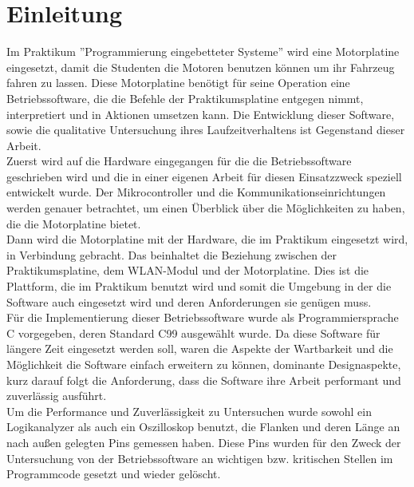 \chapter{Einleitung}

Im Praktikum ''Programmierung eingebetteter Systeme'' wird eine Motorplatine \cite{STUD_TIMO}
eingesetzt, damit die Studenten die Motoren benutzen können um ihr Fahrzeug
fahren zu lassen. Diese Motorplatine benötigt für seine Operation eine
Betriebssoftware, die die Befehle der Praktikumsplatine entgegen nimmt,
interpretiert und in Aktionen umsetzen kann. Die Entwicklung dieser Software,
sowie die qualitative Untersuchung ihres Laufzeitverhaltens ist Gegenstand
dieser Arbeit.\\
Zuerst wird auf die Hardware eingegangen für die die Betriebssoftware geschrieben wird
und die in einer eigenen Arbeit für diesen Einsatzzweck speziell entwickelt wurde.
Der Mikrocontroller und die Kommunikationseinrichtungen werden genauer betrachtet, um
einen Überblick über die Möglichkeiten zu haben, die die Motorplatine bietet.\\
Dann wird die Motorplatine mit der Hardware, die im Praktikum eingesetzt wird, in Verbindung
gebracht. Das beinhaltet die Beziehung zwischen der Praktikumsplatine, dem WLAN-Modul und der
Motorplatine. Dies ist die Plattform, die im Praktikum benutzt wird und somit die Umgebung in
der die Software auch eingesetzt wird und deren Anforderungen sie genügen muss.\\
Für die Implementierung dieser Betriebssoftware wurde als Programmiersprache
C \cite{C_PROG} vorgegeben, deren Standard C99 ausgewählt wurde. Da diese
Software für längere Zeit eingesetzt werden soll, waren die Aspekte der
Wartbarkeit und die Möglichkeit die Software einfach erweitern zu können,
dominante Designaspekte, kurz darauf folgt die Anforderung, dass die Software
ihre Arbeit performant und zuverlässig ausführt.\\
Um die Performance und Zuverlässigkeit zu Untersuchen wurde sowohl ein
Logikanalyzer als auch ein Oszilloskop benutzt, die Flanken und deren Länge
an nach außen gelegten Pins gemessen haben. Diese Pins wurden für den Zweck
der Untersuchung von der Betriebssoftware an wichtigen bzw. kritischen Stellen
im Programmcode gesetzt und wieder gelöscht.
